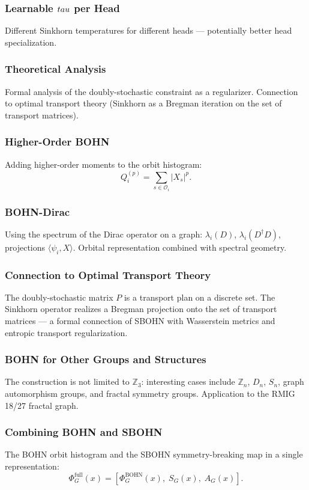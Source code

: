 \documentclass[11pt,a4paper]{report}
\begin{document}
\subsubsection{Learnable $\\tau$ per Head}
Different Sinkhorn temperatures for different heads --- potentially better head specialization.

\subsubsection{Theoretical Analysis}
Formal analysis of the doubly-stochastic constraint as a regularizer.  Connection to optimal transport theory (Sinkhorn as a Bregman iteration on the set of transport matrices).

\subsubsection{Higher-Order BOHN}
Adding higher-order moments to the orbit histogram:
\[
Q_i^{(p)} = \sum_{s\in\mathcal{O}_i} |X_s|^p.
\]

\subsubsection{BOHN-Dirac}
Using the spectrum of the Dirac operator on a graph:
$\lambda_i(D)$, $\lambda_i(D^\dagger D)$, projections $\langle\psi_i, X\rangle$.
Orbital representation combined with spectral geometry.

\subsubsection{Connection to Optimal Transport Theory}
The doubly-stochastic matrix $P$ is a transport plan on a discrete set.
The Sinkhorn operator realizes a Bregman projection onto the set of transport matrices --- a formal
connection of SBOHN with Wasserstein metrics and entropic transport regularization.

\subsubsection{BOHN for Other Groups and Structures}
The construction is not limited to $\mathbb{Z}_3$: interesting cases include $\mathbb{Z}_n$, $D_n$, $S_n$, graph automorphism groups, and fractal symmetry groups.  Application to the RMIG 18/27 fractal graph.

\subsubsection{Combining BOHN and SBOHN}
The BOHN orbit histogram and the SBOHN symmetry-breaking map in a single representation:
\[
\Phi_G^{\mathrm{full}}(x)
=\left[\Phi_G^{\mathrm{BOHN}}(x),\; S_G(x),\; A_G(x)\right].
\]
\end{document}
